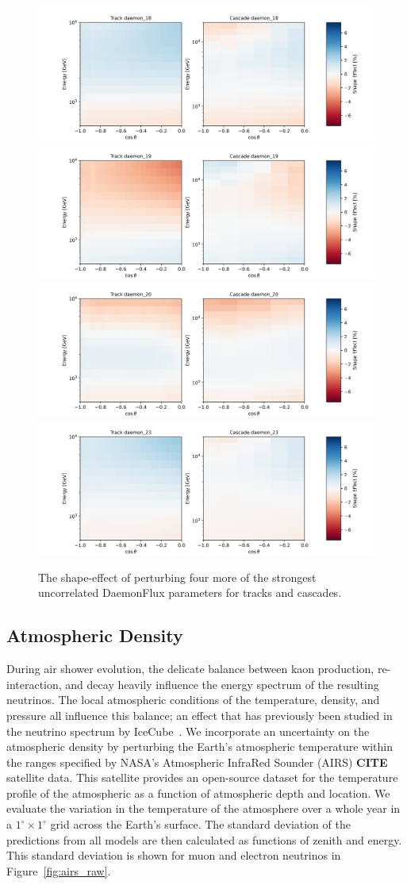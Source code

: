 \documentclass[main.tex]{subfiles}
\begin{document}
\begin{figure}
    \centering
    \includegraphics[width=0.45\linewidth]{figures/systematics/daemon_18.png}%
    \includegraphics[width=0.45\linewidth]{figures/systematics/daemon_19.png}\\
    \includegraphics[width=0.45\linewidth]{figures/systematics/daemon_20.png}%
    \includegraphics[width=0.45\linewidth]{figures/systematics/daemon_23.png}
    \caption{The shape-effect of perturbing four more of the strongest uncorrelated DaemonFlux parameters for tracks and cascades.}\label{fig:daemon_analysis_two}
\end{figure}

\subsection{Atmospheric Density}

During air shower evolution, the delicate balance between kaon production, re-interaction, and decay heavily influence the energy spectrum of the resulting neutrinos. 
The local atmospheric conditions of the temperature, density, and pressure all influence this balance; an effect that has previously been studied in the neutrino spectrum by IceCube~\cite{heix2019seasonal,abbasi2023observation}. 
We incorporate an uncertainty on the atmospheric density by perturbing the Earth's atmospheric temperature within the ranges specified by NASA's Atmospheric InfraRed Sounder (AIRS) \textbf{CITE} satellite data. 
This satellite provides an open-source dataset for the temperature profile of the atmospheric as a function of atmospheric depth and location. 
We evaluate the variation in the temperature of the atmosphere over a whole year in a $1^{\circ}\times1^{\circ}$ grid across the Earth's surface. 
The standard deviation of the predictions from all models are then calculated as functions of zenith and energy. 
This standard deviation is shown for muon and electron neutrinos in Figure~\ref{fig:airs_raw}.
\end{document}
